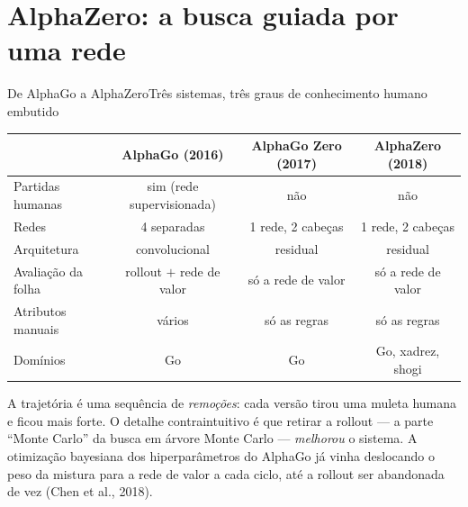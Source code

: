 \documentclass[aspectratio=169, 10pt]{beamer}
\begin{document}
\section{AlphaZero: a busca guiada por uma rede}

\begin{frame}{De AlphaGo a AlphaZero}{Três sistemas, três graus de conhecimento humano embutido}
  \small
  \begin{center}
  \begin{tabular}{lccc}
    \toprule
     & \textbf{AlphaGo} (2016) & \textbf{AlphaGo Zero} (2017) & \textbf{AlphaZero} (2018) \\
    \midrule
    Partidas humanas       & sim (rede supervisionada) & \alert{não} & \alert{não} \\
    Redes                  & 4 separadas & 1 rede, 2 cabeças & 1 rede, 2 cabeças \\
    Arquitetura            & convolucional & residual & residual \\
    Avaliação da folha     & rollout $+$ rede de valor & \alert{só a rede de valor} & só a rede de valor \\
    Atributos manuais      & vários & só as regras & só as regras \\
    Domínios               & Go & Go & Go, xadrez, shogi \\
    \bottomrule
  \end{tabular}
  \end{center}

  \medskip
  \begin{ideiabox}
    A trajetória é uma sequência de \emph{remoções}: cada versão tirou uma muleta
    humana e ficou mais forte. O detalhe contraintuitivo é que retirar a rollout —
    a parte ``Monte Carlo'' da busca em árvore Monte Carlo — \emph{melhorou} o
    sistema. A otimização bayesiana dos hiperparâmetros do AlphaGo já vinha
    deslocando o peso da mistura para a rede de valor a cada ciclo, até a rollout
    ser abandonada de vez (Chen et al., 2018).
  \end{ideiabox}
\end{frame}
\end{document}
